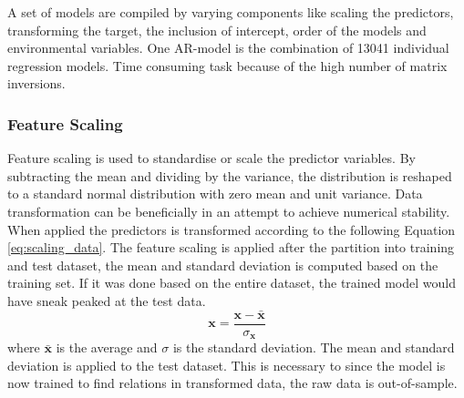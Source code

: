 A set of models are compiled by varying components like scaling the predictors, transforming the target, the inclusion of intercept, order of the models and environmental variables. One AR-model is the combination of 13041 individual regression models. Time consuming task because of the high number of matrix inversions. 




\subsubsection{Feature Scaling} \label{sec:scaling_predictors}

Feature scaling is used to standardise or scale the predictor variables. By subtracting the mean and dividing by the variance, the distribution is reshaped to a standard normal distribution with zero mean and unit variance. Data transformation can be beneficially in an attempt to achieve numerical stability. When applied the predictors is transformed according to the following Equation \ref{eq:scaling_data}. The feature scaling is applied after the partition into training and test dataset, the mean and standard deviation is computed based on the training set. If it was done based on the entire dataset, the trained model would have sneak peaked at the test data.
\begin{equation} \label{eq:scaling_data}
    \mathbf{x} = \frac{\mathbf{x} - \bar{\mathbf{x}}}{\sigma_{\mathbf{x}}}
\end{equation}
where $\bar{\mathbf{x}}$ is the average and $\sigma$ is the standard deviation.
The mean and standard deviation is applied to the test dataset. This is necessary to since the model is now trained to find relations in transformed data, the raw data is out-of-sample.

